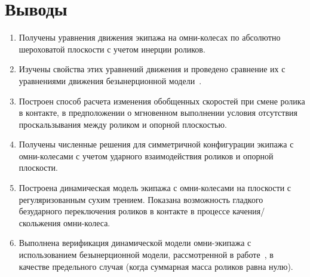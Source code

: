 
\chapter*{Выводы}

\begin{enumerate}

\item
Получены уравнения движения экипажа на омни-колесах по абсолютно шероховатой плоскости с учетом инерции роликов.

\item
Изучены свойства этих уравнений движения и проведено сравнение их с уравнениями движения безынерционной модели~\cite{Zobova2011}.

\item
Построен способ расчета изменения обобщенных скоростей при смене ролика в контакте, в предположении о мгновенном выполнении условия отсутствия проскальзывания между роликом и опорной плоскостью.

\item
Получены численные решения для симметричной конфигурации экипажа с омни-колесами с учетом ударного взаимодействия роликов и опорной плоскости.

\item
Построена динамическая модель экипажа с омни-колесами на плоскости с регуляризованным сухим трением. Показана возможность гладкого безударного переключения роликов в контакте в процессе качения/скольжения омни-колеса.

\item
Выполнена верификация динамической модели омни-экипажа с использованием безынерционной модели, рассмотренной в работе~\cite{Borisov2011}, в качестве предельного случая (когда суммарная масса роликов равна нулю).

\end{enumerate}
